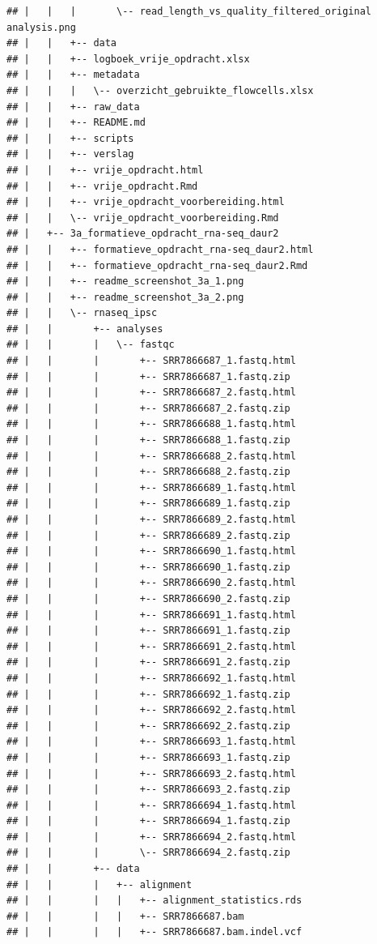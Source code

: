 \documentclass[
]{book}
\begin{document}
\begin{verbatim}
## |   |   |       \-- read_length_vs_quality_filtered_original analysis.png
## |   |   +-- data
## |   |   +-- logboek_vrije_opdracht.xlsx
## |   |   +-- metadata
## |   |   |   \-- overzicht_gebruikte_flowcells.xlsx
## |   |   +-- raw_data
## |   |   +-- README.md
## |   |   +-- scripts
## |   |   +-- verslag
## |   |   +-- vrije_opdracht.html
## |   |   +-- vrije_opdracht.Rmd
## |   |   +-- vrije_opdracht_voorbereiding.html
## |   |   \-- vrije_opdracht_voorbereiding.Rmd
## |   +-- 3a_formatieve_opdracht_rna-seq_daur2
## |   |   +-- formatieve_opdracht_rna-seq_daur2.html
## |   |   +-- formatieve_opdracht_rna-seq_daur2.Rmd
## |   |   +-- readme_screenshot_3a_1.png
## |   |   +-- readme_screenshot_3a_2.png
## |   |   \-- rnaseq_ipsc
## |   |       +-- analyses
## |   |       |   \-- fastqc
## |   |       |       +-- SRR7866687_1.fastq.html
## |   |       |       +-- SRR7866687_1.fastq.zip
## |   |       |       +-- SRR7866687_2.fastq.html
## |   |       |       +-- SRR7866687_2.fastq.zip
## |   |       |       +-- SRR7866688_1.fastq.html
## |   |       |       +-- SRR7866688_1.fastq.zip
## |   |       |       +-- SRR7866688_2.fastq.html
## |   |       |       +-- SRR7866688_2.fastq.zip
## |   |       |       +-- SRR7866689_1.fastq.html
## |   |       |       +-- SRR7866689_1.fastq.zip
## |   |       |       +-- SRR7866689_2.fastq.html
## |   |       |       +-- SRR7866689_2.fastq.zip
## |   |       |       +-- SRR7866690_1.fastq.html
## |   |       |       +-- SRR7866690_1.fastq.zip
## |   |       |       +-- SRR7866690_2.fastq.html
## |   |       |       +-- SRR7866690_2.fastq.zip
## |   |       |       +-- SRR7866691_1.fastq.html
## |   |       |       +-- SRR7866691_1.fastq.zip
## |   |       |       +-- SRR7866691_2.fastq.html
## |   |       |       +-- SRR7866691_2.fastq.zip
## |   |       |       +-- SRR7866692_1.fastq.html
## |   |       |       +-- SRR7866692_1.fastq.zip
## |   |       |       +-- SRR7866692_2.fastq.html
## |   |       |       +-- SRR7866692_2.fastq.zip
## |   |       |       +-- SRR7866693_1.fastq.html
## |   |       |       +-- SRR7866693_1.fastq.zip
## |   |       |       +-- SRR7866693_2.fastq.html
## |   |       |       +-- SRR7866693_2.fastq.zip
## |   |       |       +-- SRR7866694_1.fastq.html
## |   |       |       +-- SRR7866694_1.fastq.zip
## |   |       |       +-- SRR7866694_2.fastq.html
## |   |       |       \-- SRR7866694_2.fastq.zip
## |   |       +-- data
## |   |       |   +-- alignment
## |   |       |   |   +-- alignment_statistics.rds
## |   |       |   |   +-- SRR7866687.bam
## |   |       |   |   +-- SRR7866687.bam.indel.vcf

\end{verbatim}
\end{document}
